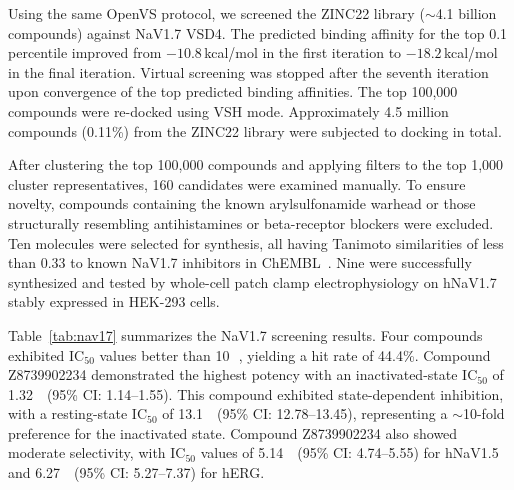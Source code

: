 \documentclass[11pt]{article}
\begin{document}
Using the same OpenVS protocol, we screened the ZINC22 library (${\sim}$4.1 billion compounds) against NaV1.7 VSD4. The predicted binding affinity for the top 0.1 percentile improved from $-10.8$\,kcal/mol in the first iteration to $-18.2$\,kcal/mol in the final iteration. Virtual screening was stopped after the seventh iteration upon convergence of the top predicted binding affinities. The top 100,000 compounds were re-docked using VSH mode. Approximately 4.5 million compounds (0.11\%) from the ZINC22 library were subjected to docking in total.

After clustering the top 100,000 compounds and applying filters to the top 1,000 cluster representatives, 160 candidates were examined manually. To ensure novelty, compounds containing the known arylsulfonamide warhead or those structurally resembling antihistamines or beta-receptor blockers were excluded. Ten molecules were selected for synthesis, all having Tanimoto similarities of less than 0.33 to known NaV1.7 inhibitors in ChEMBL~\citep{chembl2024}. Nine were successfully synthesized and tested by whole-cell patch clamp electrophysiology on hNaV1.7 stably expressed in HEK-293 cells.

Table~\ref{tab:nav17} summarizes the NaV1.7 screening results. Four compounds exhibited IC$_{50}$ values better than 10\,\si{\micro\molar}, yielding a hit rate of 44.4\%. Compound Z8739902234 demonstrated the highest potency with an inactivated-state IC$_{50}$ of 1.32\,\si{\micro\molar} (95\% CI: 1.14--1.55). This compound exhibited state-dependent inhibition, with a resting-state IC$_{50}$ of 13.1\,\si{\micro\molar} (95\% CI: 12.78--13.45), representing a ${\sim}$10-fold preference for the inactivated state. Compound Z8739902234 also showed moderate selectivity, with IC$_{50}$ values of 5.14\,\si{\micro\molar} (95\% CI: 4.74--5.55) for hNaV1.5 and 6.27\,\si{\micro\molar} (95\% CI: 5.27--7.37) for hERG.
\end{document}
